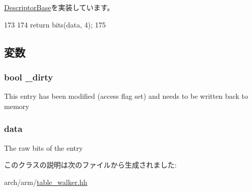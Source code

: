 \hyperlink{classArmISA_1_1TableWalker_1_1DescriptorBase_a92c5947cbc7259f6e536de82f5b33e4f}{DescriptorBase}を実装しています。


\begin{DoxyCode}
173         {
174             return bits(data, 4);
175         }
\end{DoxyCode}


\subsection{変数}
\hypertarget{classArmISA_1_1TableWalker_1_1L1Descriptor_ad9d7d92a6dc33a9bf186020af3053844}{
\subsubsection[{\_\-dirty}]{\setlength{\rightskip}{0pt plus 5cm}bool {\bf \_\-dirty}}}
\label{classArmISA_1_1TableWalker_1_1L1Descriptor_ad9d7d92a6dc33a9bf186020af3053844}
This entry has been modified (access flag set) and needs to be written back to memory \hypertarget{classArmISA_1_1TableWalker_1_1L1Descriptor_a1e43bf7d608e87228b625cca2c04d641}{
\subsubsection[{data}]{ {\bf data}}}
\label{classArmISA_1_1TableWalker_1_1L1Descriptor_a1e43bf7d608e87228b625cca2c04d641}
The raw bits of the entry 

このクラスの説明は次のファイルから生成されました:\begin{DoxyCompactItemize}
\item 
arch/arm/\hyperlink{table__walker_8hh}{table\_\-walker.hh}\end{DoxyCompactItemize}
